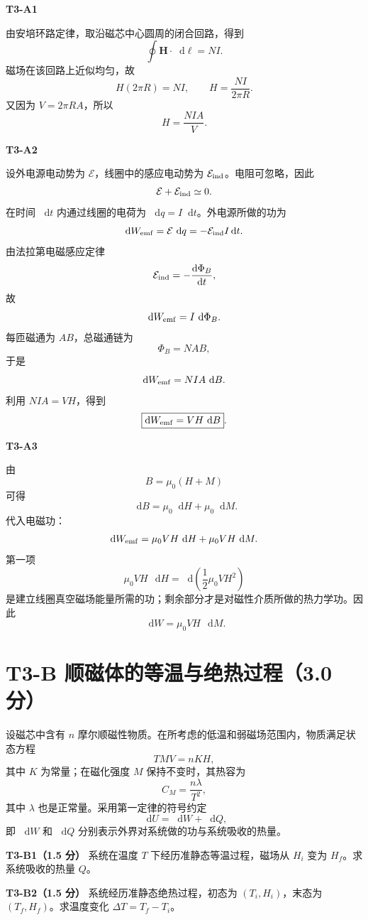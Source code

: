 \documentclass[UTF8,11pt,a4paper,fontset=fandol]{ctexart}
\newcommand{\dd}{\mathop{}\!\mathrm d}
\newcommand{\vect}[1]{\bm{#1}}
\begin{document}
\begin{solutionbox}
\textbf{T3-A1}

由安培环路定律，取沿磁芯中心圆周的闭合回路，得到
\[
\oint \vect H\cdot \dd\vect\ell=NI.
\]
磁场在该回路上近似均匀，故
\[
H(2\pi R)=NI,
\qquad H=\frac{NI}{2\pi R}.
\]
又因为 $V=2\pi R A$，所以
\[
\boxed{H=\frac{NIA}{V}}.
\]

\textbf{T3-A2}

设外电源电动势为 $\mathcal E$，线圈中的感应电动势为 $\mathcal E_{\rm ind}$。电阻可忽略，因此
\[
\mathcal E+\mathcal E_{\rm ind}\simeq0.
\]
在时间 $\dd t$ 内通过线圈的电荷为 $\dd q=I\dd t$。外电源所做的功为
\[
\dd W_{\rm emf}=\mathcal E\,\dd q
=-\mathcal E_{\rm ind}I\dd t.
\]
由法拉第电磁感应定律
\[
\mathcal E_{\rm ind}=-\frac{\dd\Phi_B}{\dd t},
\]
故
\[
\dd W_{\rm emf}=I\,\dd\Phi_B.
\]
每匝磁通为 $AB$，总磁通链为
\[
\Phi_B=NAB,
\]
于是
\[
\dd W_{\rm emf}=NIA\,\dd B.
\]
利用 $NIA=VH$，得到
\[
\boxed{\dd W_{\rm emf}=VH\,\dd B}.
\]

\textbf{T3-A3}

由
\[
B=\mu_0(H+M)
\]
可得
\[
\dd B=\mu_0\dd H+\mu_0\dd M.
\]
代入电磁功：
\[
\dd W_{\rm emf}
=\mu_0VH\,\dd H+\mu_0VH\,\dd M.
\]
第一项
\[
\mu_0VH\,\dd H=\dd\!\left(\frac12\mu_0VH^2\right)
\]
是建立线圈真空磁场能量所需的功；剩余部分才是对磁性介质所做的热力学功。因此
\[
\boxed{\dd W=\mu_0VH\,\dd M}.
\]
\end{solutionbox}

\section{T3-B 顺磁体的等温与绝热过程（3.0 分）}

\begin{problembox}
设磁芯中含有 $n$ 摩尔顺磁性物质。在所考虑的低温和弱磁场范围内，物质满足状态方程
\[
TMV=nKH,
\]
其中 $K$ 为常量；在磁化强度 $M$ 保持不变时，其热容为
\[
C_M=\frac{n\lambda}{T^2},
\]
其中 $\lambda$ 也是正常量。采用第一定律的符号约定
\[
\dd U=\dd W+\dd Q,
\]
即 $\dd W$ 和 $\dd Q$ 分别表示外界对系统做的功与系统吸收的热量。

\textbf{T3-B1（1.5 分）} 系统在温度 $T$ 下经历准静态等温过程，磁场从 $H_i$ 变为 $H_f$。求系统吸收的热量 $Q$。

\textbf{T3-B2（1.5 分）} 系统经历准静态绝热过程，初态为 $(T_i,H_i)$，末态为 $(T_f,H_f)$。求温度变化 $\Delta T=T_f-T_i$。
\end{problembox}
\end{document}
